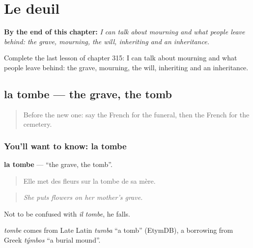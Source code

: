 
\chapter{Le deuil}
\label{ch:fr-le-deuil}

\begin{chapteropening}
\textbf{By the end of this chapter:} \emph{I can talk about mourning and what people leave behind: the grave, mourning, the will, inheriting and an inheritance.}

Complete the last lesson of chapter 315: I can talk about mourning and what people leave behind: the grave, mourning, the will, inheriting and an inheritance.
\end{chapteropening}

\section[la tombe]{la tombe — the grave, the tomb}

\label{lesson:FR-C315-tombe}



\begin{quote}
Before the new one: say the French for the funeral, then the French for the cemetery.
\end{quote}

\subsection*{You'll want to know: la tombe}
\textbf{la tombe} — \textquotedblleft{}the grave, the tomb\textquotedblright{}.

\begin{quote}
Elle met des fleurs sur la tombe de sa mère.
\end{quote}

\begin{quote}
\emph{She puts flowers on her mother's grave.}
\end{quote}

Not to be confused with \emph{il tombe}, he falls.

\begin{cousinweb}
\emph{tombe} comes from Late Latin \emph{tumba} \textquotedblleft{}a tomb\textquotedblright{} (EtymDB), a borrowing from Greek \emph{týmbos} \textquotedblleft{}a burial mound\textquotedblright{}.
\end{cousinweb}

